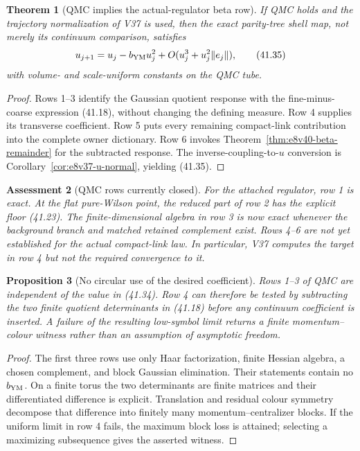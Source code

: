 \documentclass[11pt,oneside]{book}
\newtheorem{theorem}{Theorem}[chapter]
\newtheorem{proposition}[theorem]{Proposition}
\newtheorem{assessment}[theorem]{Assessment}
\theoremstyle{definition}
\theoremstyle{remark}
\begin{document}
\begin{theorem}[QMC implies the actual-regulator beta row]
\label{thm:e8v41-QMC-beta}
If QMC holds and the trajectory normalization of V37 is used, then
the exact parity-tree shell map, not merely its continuum comparison,
satisfies
\[
 u_{j+1}=u_j-b_{\rm YM}u_j^2
 +O(u_j^3+u_j^2\|e_j\|),                                       \tag{41.35}
\]
with volume- and scale-uniform constants on the QMC tube.
\end{theorem}

\begin{proof}
Rows 1--3 identify the Gaussian quotient response with the
fine-minus-coarse expression (41.18), without changing the defining
measure.  Row 4 supplies its transverse coefficient.  Row 5 puts
every remaining compact-link contribution into the complete owner
dictionary.  Row 6 invokes
Theorem~\ref{thm:e8v40-beta-remainder} for the subtracted response.
The inverse-coupling-to-\(u\) conversion is
Corollary~\ref{cor:e8v37-u-normal}, yielding (41.35).
\end{proof}

\begin{assessment}[QMC rows currently closed]
\label{ass:e8v41-QMC-status}
For the attached regulator, row 1 is exact.  At the flat pure-Wilson
point, the reduced part of row 2 has the explicit floor (41.23).
The finite-dimensional algebra in row 3 is now exact whenever the
background branch and matched retained complement exist.  Rows
4--6 are not yet established for the actual compact-link law.  In
particular, V37 computes the target in row 4 but not the required
convergence to it.
\end{assessment}

\begin{proposition}[No circular use of the desired coefficient]
\label{prop:e8v41-no-coefficient-circle}
Rows 1--3 of QMC are independent of the value in (41.34).  Row 4 can
therefore be tested by subtracting the two finite quotient
determinants in (41.18) before any continuum coefficient is inserted.
A failure of the resulting low-symbol limit returns a finite
momentum--colour witness rather than an assumption of asymptotic
freedom.
\end{proposition}

\begin{proof}
The first three rows use only Haar factorization, finite Hessian
algebra, a chosen complement, and block Gaussian elimination.  Their
statements contain no \(b_{\rm YM}\).  On a finite torus the two
determinants are finite matrices and their differentiated difference
is explicit.  Translation and residual colour symmetry decompose
that difference into finitely many momentum--centralizer blocks.
If the uniform limit in row 4 fails, the maximum block loss is
attained; selecting a maximizing subsequence gives the asserted
witness.
\end{proof}
\end{document}
